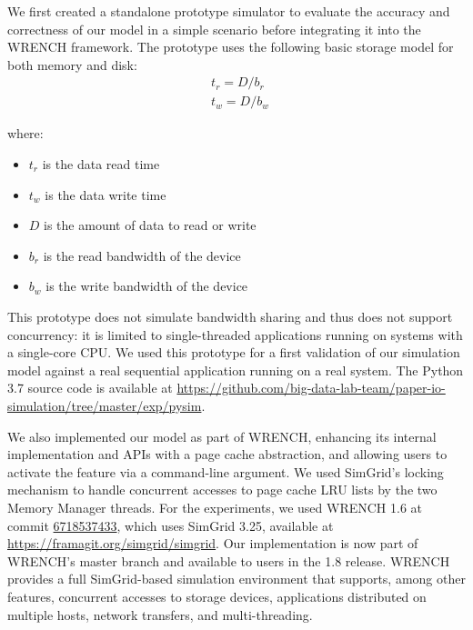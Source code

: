 \documentclass[conference]{IEEEtran}
\newcommand{\simgrid}{SimGrid\xspace}
\newcommand{\wrench}{WRENCH\xspace}
\begin{document}
            We first created a standalone prototype
            simulator to evaluate the accuracy and correctness of our
            model in a simple scenario before integrating it into the
            \wrench framework.
            The prototype uses the following basic storage model for
            both memory and disk:
            \begin{align*}
                & t_{r} = D / b_r \\
                & t_{w} = D / b_w\
            \end{align*}

            where:
            \begin{itemize}
                \item $t_{r}$ is the data read time
                \item $t_{w}$ is the data write time
                \item $D$ is the amount of data to read or write
                \item $b_r$ is the read bandwidth of the device
                \item $b_w$ is the write bandwidth of the device
            \end{itemize}

            This prototype does not simulate  bandwidth sharing and thus does not support
            concurrency: it is limited to single-threaded applications running on systems
            with a single-core CPU. We used this prototype for a first validation of our simulation
            model against a real sequential application running on a real system.
            The Python 3.7 source code is available at
            \url{https://github.com/big-data-lab-team/paper-io-simulation/tree/master/exp/pysim}.

            We also implemented our model as part of \wrench, enhancing its
            internal implementation and APIs with a page cache abstraction,
            and allowing users to activate the feature via a command-line
            argument. We used SimGrid's locking mechanism to handle
            concurrent accesses to page cache LRU lists by the two Memory
            Manager threads. For the experiments, we used
            \wrench 1.6 at commit
            \href{https://github.com/wrench-project/wrench/tree/67185374330d2c4bf274fce222c937e838df5b03}{6718537433},
            which uses \simgrid 3.25, available at
            \url{https://framagit.org/simgrid/simgrid}. Our implementation
            is now part of \wrench's master branch and available to
            users in the 1.8 release. \wrench provides a full \simgrid-based simulation 
            environment that supports, among other features, concurrent accesses to storage devices, 
            applications distributed on multiple hosts, network transfers, 
            and multi-threading. 
\end{document}
